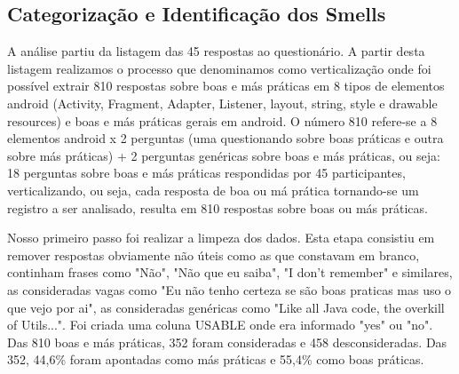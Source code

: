 
\subsection{Categoriza\c{c}\~ao e Identifica\c{c}\~ao dos Smells}

A an\'alise partiu da listagem das 45 respostas ao question\'ario. A partir desta listagem realizamos o processo que denominamos como verticaliza\c{c}\~ao onde foi poss\'ivel extrair 810 respostas sobre boas e m\'as pr\'aticas em 8 tipos de elementos android (Activity, Fragment, Adapter, Listener, layout, string, style e drawable resources) e boas e m\'as pr\'aticas gerais em android. O n\'umero 810 refere-se a 8 elementos android x 2 perguntas (uma questionando sobre boas pr\'aticas e outra sobre m\'as pr\'aticas) + 2 perguntas gen\'ericas sobre boas e m\'as pr\'aticas, ou seja: 18 perguntas sobre boas e m\'as pr\'aticas respondidas por 45 participantes, verticalizando, ou seja, cada resposta de boa ou m\'a pr\'atica tornando-se um registro a ser analisado, resulta em 810 respostas sobre boas ou m\'as pr\'aticas.

Nosso primeiro passo foi realizar a limpeza dos dados. Esta etapa consistiu em remover respostas obviamente n\~ao \'uteis como as que constavam em branco, continham frases como "N\~ao", "N\~ao que eu saiba", "I don't remember" e similares, as consideradas vagas como "Eu n\~ao tenho certeza se s\~ao boas praticas mas uso o que vejo por ai", as consideradas gen\'ericas como "Like all Java code, the overkill of Utils...". Foi criada uma coluna USABLE onde era informado "yes" ou "no". Das 810 boas e m\'as pr\'aticas, 352 foram consideradas e 458 desconsideradas. Das 352, 44,6\% foram apontadas como m\'as pr\'aticas e 55,4\% como boas pr\'aticas. 

